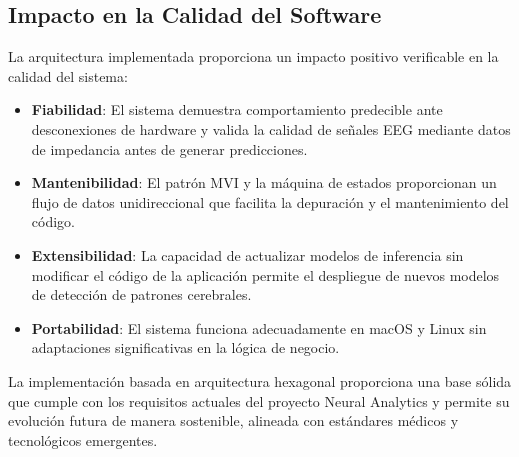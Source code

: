 \subsection{Impacto en la Calidad del Software}

La arquitectura implementada proporciona un impacto positivo verificable en la calidad del sistema:

\begin{itemize}
    \item \textbf{Fiabilidad}: El sistema demuestra comportamiento predecible ante desconexiones de hardware y valida la calidad de señales EEG mediante datos de impedancia antes de generar predicciones.
    
    \item \textbf{Mantenibilidad}: El patrón MVI y la máquina de estados proporcionan un flujo de datos unidireccional que facilita la depuración y el mantenimiento del código.
    
    \item \textbf{Extensibilidad}: La capacidad de actualizar modelos de inferencia sin modificar el código de la aplicación permite el despliegue de nuevos modelos de detección de patrones cerebrales.
    
    \item \textbf{Portabilidad}: El sistema funciona adecuadamente en macOS y Linux sin adaptaciones significativas en la lógica de negocio.
\end{itemize}

La implementación basada en arquitectura hexagonal proporciona una base sólida que cumple con los requisitos actuales del proyecto Neural Analytics y permite su evolución futura de manera sostenible, alineada con estándares médicos y tecnológicos emergentes.
